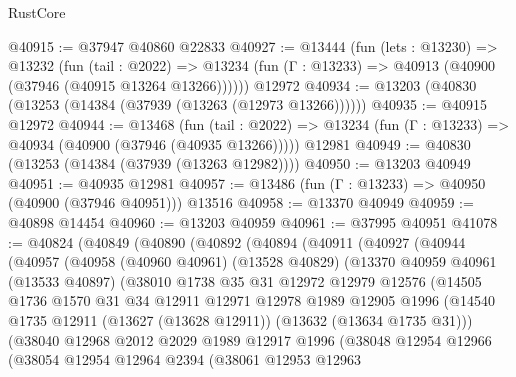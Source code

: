 \begin{lexlean}{RustCore}
\begin{coremodule}
@40915 := @37947 @40860 @22833
@40927 := @13444
    (fun (lets : @13230) =>
    @13232
      (fun (tail : @2022) =>
      @13234 (fun (Γ : @13233) => @40913 (@40900 (@37946 (@40915 @13264 @13266))))))
    @12972
@40934 := @13203 (@40830 (@13253 (@14384 (@37939 (@13263 (@12973 @13266))))))
@40935 := @40915 @12972
@40944 := @13468
    (fun (tail : @2022) => @13234 (fun (Γ : @13233) => @40934 (@40900 (@37946 (@40935 @13266)))))
    @12981
@40949 := @40830 (@13253 (@14384 (@37939 (@13263 @12982))))
@40950 := @13203 @40949
@40951 := @40935 @12981
@40957 := @13486 (fun (Γ : @13233) => @40950 (@40900 (@37946 @40951))) @13516
@40958 := @13370 @40949
@40959 := @40898 @14454
@40960 := @13203 @40959
@40961 := @37995 @40951
@41078 := @40824
    (@40849
      (@40890
        (@40892
          (@40894
            (@40911
              (@40927
                (@40944
                  (@40957
                    (@40958
                      (@40960 @40961)
                      (@13528 @40829)
                      (@13370
                        @40959
                        @40961
                        (@13533 @40897)
                        (@38010
                          @1738
                          @35
                          @31
                          @12972
                          @12979
                          @12576
                          (@14505
                            @1736
                            @1570
                            @31
                            @34
                            @12911
                            @12971
                            @12978
                            @1989
                            @12905
                            @1996
                            (@14540
                              @1735
                              @12911
                              (@13627 (@13628 @12911))
                              (@13632 (@13634 @1735 @31)))
                            (@38040
                              @12968
                              @2012
                              @2029
                              @1989
                              @12917
                              @1996
                              (@38048
                                @12954
                                @12966
                                (@38054
                                  @12954
                                  @12964
                                  @2394
                                  (@38061
                                    @12953
                                    @12963

\end{coremodule}
\end{lexlean}
